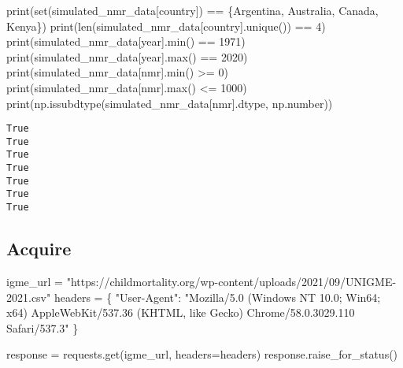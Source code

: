 \documentclass[
  letterpaper,
  DIV=11,
  numbers=noendperiod]{scrreprt}
\newenvironment{Shaded}{\begin{snugshade}}{\end{snugshade}}
\newcommand{\BuiltInTok}[1]{\textcolor[rgb]{0.00,0.23,0.31}{#1}}
\newcommand{\DecValTok}[1]{\textcolor[rgb]{0.68,0.00,0.00}{#1}}
\newcommand{\NormalTok}[1]{\textcolor[rgb]{0.00,0.23,0.31}{#1}}
\newcommand{\OperatorTok}[1]{\textcolor[rgb]{0.37,0.37,0.37}{#1}}
\newcommand{\StringTok}[1]{\textcolor[rgb]{0.13,0.47,0.30}{#1}}
\begin{document}
\begin{Shaded}
\begin{Highlighting}[]
\BuiltInTok{print}\NormalTok{(}\BuiltInTok{set}\NormalTok{(simulated\_nmr\_data[}\StringTok{\textquotesingle{}country\textquotesingle{}}\NormalTok{]) }\OperatorTok{==}\NormalTok{ \{}\StringTok{\textquotesingle{}Argentina\textquotesingle{}}\NormalTok{, }\StringTok{\textquotesingle{}Australia\textquotesingle{}}\NormalTok{, }\StringTok{\textquotesingle{}Canada\textquotesingle{}}\NormalTok{, }\StringTok{\textquotesingle{}Kenya\textquotesingle{}}\NormalTok{\})}
\BuiltInTok{print}\NormalTok{(}\BuiltInTok{len}\NormalTok{(simulated\_nmr\_data[}\StringTok{\textquotesingle{}country\textquotesingle{}}\NormalTok{].unique()) }\OperatorTok{==} \DecValTok{4}\NormalTok{)}
\BuiltInTok{print}\NormalTok{(simulated\_nmr\_data[}\StringTok{\textquotesingle{}year\textquotesingle{}}\NormalTok{].}\BuiltInTok{min}\NormalTok{() }\OperatorTok{==} \DecValTok{1971}\NormalTok{)}
\BuiltInTok{print}\NormalTok{(simulated\_nmr\_data[}\StringTok{\textquotesingle{}year\textquotesingle{}}\NormalTok{].}\BuiltInTok{max}\NormalTok{() }\OperatorTok{==} \DecValTok{2020}\NormalTok{)}
\BuiltInTok{print}\NormalTok{(simulated\_nmr\_data[}\StringTok{\textquotesingle{}nmr\textquotesingle{}}\NormalTok{].}\BuiltInTok{min}\NormalTok{() }\OperatorTok{\textgreater{}=} \DecValTok{0}\NormalTok{)}
\BuiltInTok{print}\NormalTok{(simulated\_nmr\_data[}\StringTok{\textquotesingle{}nmr\textquotesingle{}}\NormalTok{].}\BuiltInTok{max}\NormalTok{() }\OperatorTok{\textless{}=} \DecValTok{1000}\NormalTok{)}
\BuiltInTok{print}\NormalTok{(np.issubdtype(simulated\_nmr\_data[}\StringTok{\textquotesingle{}nmr\textquotesingle{}}\NormalTok{].dtype, np.number))}
\end{Highlighting}
\end{Shaded}

\begin{verbatim}
True
True
True
True
True
True
True
\end{verbatim}

\hypertarget{acquire-2}{%
\subsection{Acquire}\label{acquire-2}}

\begin{Shaded}
\begin{Highlighting}[]
\NormalTok{igme\_url }\OperatorTok{=} \StringTok{"https://childmortality.org/wp{-}content/uploads/2021/09/UNIGME{-}2021.csv"}
\NormalTok{headers }\OperatorTok{=}\NormalTok{ \{}
    \StringTok{"User{-}Agent"}\NormalTok{: }\StringTok{"Mozilla/5.0 (Windows NT 10.0; Win64; x64) AppleWebKit/537.36 (KHTML, like Gecko) Chrome/58.0.3029.110 Safari/537.3"}
\NormalTok{\}}

\NormalTok{response }\OperatorTok{=}\NormalTok{ requests.get(igme\_url, headers}\OperatorTok{=}\NormalTok{headers)}
\NormalTok{response.raise\_for\_status() }
\end{Highlighting}
\end{Shaded}
\end{document}
